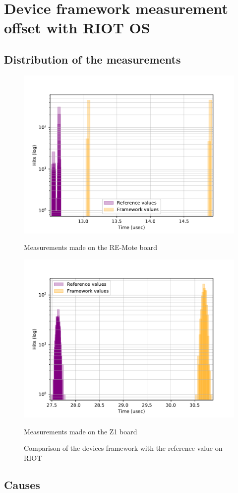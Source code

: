 \section{Device framework measurement offset with RIOT OS}

\subsection{Distribution of the measurements}

\begin{figure}[!ht]
  \centering
  \includegraphics[scale=.7]{assets/comparison-devices-framework-riot-remote.pdf}
  \caption*{Measurements made on the RE-Mote board}

  \centering
  \includegraphics[scale=.7]{assets/comparison-devices-framework-riot-z1.pdf}
  \caption*{Measurements made on the Z1 board}
  \caption{Comparison of the devices framework with the reference value on RIOT\label{fig:devices-comparison-riot}}
\end{figure}

\subsection{Causes}